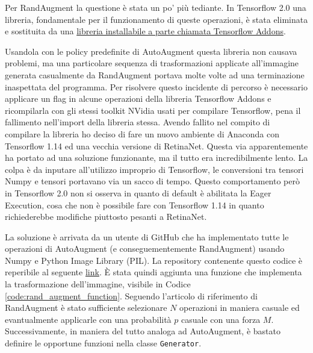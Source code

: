 Per RandAugment la questione è stata un po' più tediante. In Tensorflow 2.0 una libreria, fondamentale per il funzionamento di queste operazioni, è stata eliminata e sostituita da una \href{https://github.com/tensorflow/addons}{libreria installabile a parte chiamata Tensorflow Addons}.

Usandola con le policy predefinite di AutoAugment questa libreria non causava problemi, ma una particolare sequenza di trasformazioni applicate all'immagine generata casualmente da RandAugment portava molte volte ad una terminazione inaspettata del programma. Per risolvere questo incidente di percorso è necessario applicare un flag in alcune operazioni della libreria Tensorflow Addons e ricompilarla con gli stessi toolkit NVidia usati per compilare Tensorflow, pena il fallimento nell'import della libreria stessa. Avendo fallito nel compito di compilare la libreria ho deciso di fare un nuovo ambiente di Anaconda con Tensorflow 1.14 ed una vecchia versione di RetinaNet. 
Questa via apparentemente ha portato ad una soluzione funzionante, ma il tutto era incredibilmente lento. La colpa è da inputare all'utilizzo improprio di Tensorflow, le conversioni tra tensori Numpy e tensori portavano via un sacco di tempo. Questo comportamento però in Tensorflow 2.0 non si osserva in quanto di default è abilitata la Eager Execution, cosa che non è possibile fare con Tensorflow 1.14 in quanto richiederebbe modifiche piuttosto pesanti a RetinaNet.  

La soluzione è arrivata da un utente di GitHub che ha implementato tutte le operazioni di AutoAugment (e conseguementemente RandAugment) usando Numpy e Python Image Library (PIL). La repository contenente questo codice è reperibile al seguente \href{https://github.com/poodarchu/learn_aug_for_object_detection.numpy}{link}.
È stata quindi aggiunta una funzione che implementa la trasformazione dell'immagine, visibile in Codice \ref{code:rand_augment_function}. Seguendo l'articolo di riferimento di RandAugment è stato sufficiente selezionare $N$ operazioni in maniera casuale ed evantualmente applicarle con una probabilità $p$ casuale con una forza $M$.
Successivamente, in maniera del tutto analoga ad AutoAugment, è bastato definire le opportune funzioni nella classe \texttt{Generator}. 

